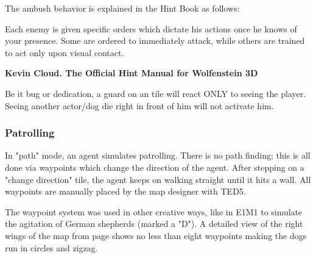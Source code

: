 \pagebreak
{} The ambush behavior is explained in the Hint Book as follows:\\
\par
\begin{fancyquotes}
Each enemy is given specific orders which dictate his actions once he knows of your presence. Some are ordered to immediately attack, while others are trained to act only upon visual contact.\\
\par
\textbf{Kevin Cloud. The Official Hint Manual for Wolfenstein 3D}
 \end{fancyquotes}
\par
{} Be it bug or dedication, a guard on an  tile will react ONLY to seeing the player. Seeing another actor/dog die right in front of him will not activate him.\\


\subsubsection{Patrolling}
In "path" mode, an agent simulates patrolling. There is no path finding; this is all done via waypoints which change the direction of the agent. After stepping on a "change direction" tile, the agent keeps on walking straight until it hits a wall. All waypoints are manually placed by the map designer with TED5.\\ 
\par
The waypoint system was used in other creative ways, like in E1M1 to simulate the agitation of German shepherds (marked a "D"). A detailed view of the right wings of the map from page \pageref{mape1m1} shows no less than eight waypoints making the dogs run in circles and zigzag.\\
\par
\begin{figure}[H]
 \centering
\end{figure}
\par




